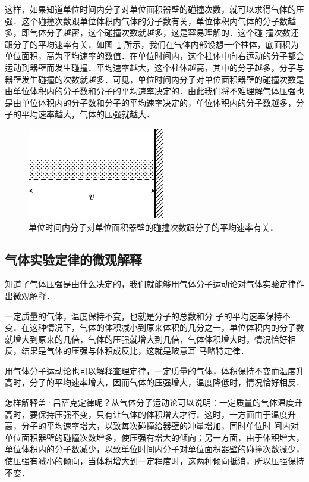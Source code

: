 这样，如果知道单位时间内分子对单位面积器壁的碰撞次数，就可以求得气体的压强．这个碰撞次数跟单位体积内气体的分子数有关，单位体积内气体的分子数越多，即气体分子越密，这个碰撞次数就越多，这是容易理解的．这个碰
撞次数还跟分子的平均速率有关．如图~\ref{fig_B_3-15} 所示，我们在气体内部设想一个柱体，底面积为单位面积，高为平均速率的数值．在单位时间内，这个柱体中向右运动的分子都会运动到器壁而发生碰撞．平均速率越大，这个柱体越高，其中的分子越多，分子与器壁发生碰撞的次数就越多．可见，单位时间内分子对单位面积器壁的碰撞次数是由单位体积内的分子数和分子的平均速率决定的．由此我们将不难理解气体压强也是由单位体积内的分子数和分子的平均速率决定的，单位体积内的分子数越多，分子的平均速率越大，气体的压强就越大．
\begin{figure}[htbp]
    \centering
    \includegraphics{fig/B/3-15.pdf}
    \caption{单位时间内分子对单位面积器壁的碰撞次数跟分子的平均速率有关．}\label{fig_B_3-15}
\end{figure}

\subsection{气体实验定律的微观解释} 
知道了气体压强是由什么决定的，我们就能够用气体分子运动论对气体实验定律作出微观解释．

一定质量的气体，温度保持不变，也就是分子的总数和分
子的平均速率保持不变．在这种情况下，气体的体积减小到原来体积的几分之一，单位体积内的分子数就增大到原来的几倍，气体的压强就增大到几倍，气体体积增大时，情况恰好相反，结果是气体的压强与体积成反比，这就是玻意耳-马略特定律．

用气体分子运动论也可以解释查理定律，一定质量的气体，体积保持不变而温度升高时，分子的平均速率增大，因而气体的压强增大，温度降低时，情况恰好相反．

怎样解释盖·吕萨克定律呢？从气体分子运动论可以说明：一定质量的气体温度升高时，要保持压强不变，只有让气体的体积增大才行．这时，一方面由于温度升高，分子的平均速率增大，以致每次碰撞给器壁的冲量增加，同时单位时
间内对单位面积器壁的碰撞次数增多，使压强有增大的倾向；另一方面，由于体积增大，单位体积内的分子数减少，以致单位时间内分子对单位面积器壁的碰撞次数减少，使压强有减小的倾向，当体积增大到一定程度时，这两种倾向抵消，所以压强保持不变．

